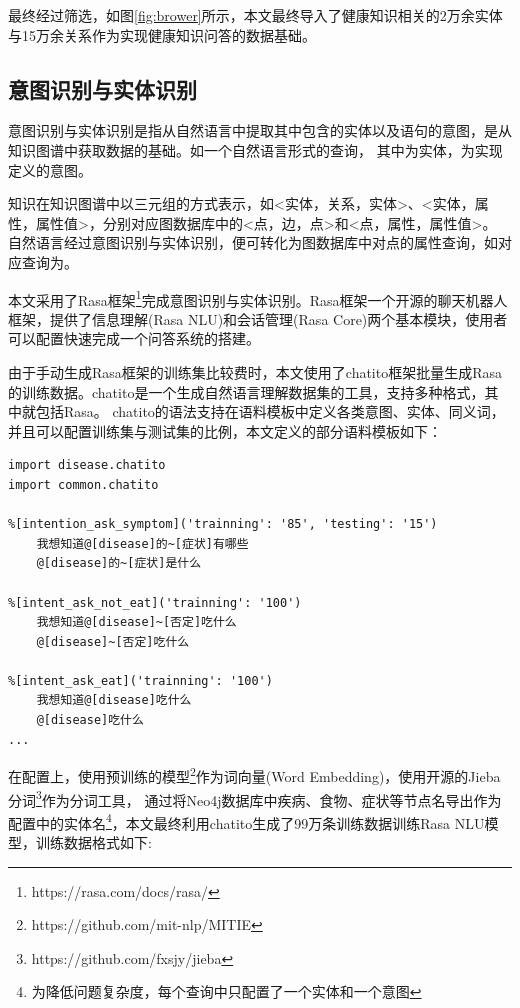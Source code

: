 最终经过筛选，如图\ref{fig:brower}所示，本文最终导入了健康知识相关的2万余实体与15万余关系作为实现健康知识问答的数据基础。

\subsection{意图识别与实体识别}

意图识别与实体识别是指从自然语言中提取其中包含的实体以及语句的意图，是从知识图谱中获取数据的基础。如一个自然语言形式的查询，
其中为实体，为实现定义的意图。

知识在知识图谱中以三元组的方式表示，如<实体，关系，实体>、<实体，属性，属性值>，分别对应图数据库中的<点，边，点>和<点，属性，属性值>。
自然语言经过意图识别与实体识别，便可转化为图数据库中对点的属性查询，如对应查询为。

本文采用了Rasa框架\footnote{https://rasa.com/docs/rasa/}完成意图识别与实体识别。Rasa框架一个开源的聊天机器人框架，提供了信息理解(Rasa NLU)和会话管理(Rasa Core)两个基本模块，使用者可以配置快速完成一个问答系统的搭建。

由于手动生成Rasa框架的训练集比较费时，本文使用了chatito框架批量生成Rasa的训练数据。chatito是一个生成自然语言理解数据集的工具，支持多种格式，其中就包括Rasa。
chatito的语法支持在语料模板中定义各类意图、实体、同义词，并且可以配置训练集与测试集的比例，本文定义的部分语料模板如下：
\begin{lstlisting}[label=lst:chatito, caption={chatito部分语料模板配置}, basicstyle=\normalsize]
import disease.chatito
import common.chatito

%[intention_ask_symptom]('trainning': '85', 'testing': '15')
    我想知道@[disease]的~[症状]有哪些
    @[disease]的~[症状]是什么

%[intent_ask_not_eat]('trainning': '100')
    我想知道@[disease]~[否定]吃什么
    @[disease]~[否定]吃什么

%[intent_ask_eat]('trainning': '100')
    我想知道@[disease]吃什么
    @[disease]吃什么
...
\end{lstlisting}

在配置上，使用预训练的模型\footnote{https://github.com/mit-nlp/MITIE}作为词向量(Word Embedding)，使用开源的Jieba分词\footnote{https://github.com/fxsjy/jieba}作为分词工具，
通过将Neo4j数据库中疾病、食物、症状等节点名导出作为配置中的实体名\footnote{为降低问题复杂度，每个查询中只配置了一个实体和一个意图}，本文最终利用chatito生成了99万条训练数据训练Rasa NLU模型，训练数据格式如下:

